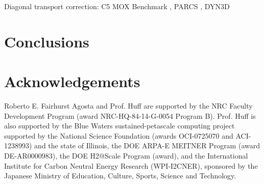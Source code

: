 \documentclass{anstrans}
\begin{document}

Diagonal transport correction:
C5 MOX Benchmark \cite{cavarec_benchmark_1994}, PARCS \cite{downar_parcs_2004}, DYN3D \cite{beckert_development_2007}

\section{Conclusions}



\section{Acknowledgements}

Roberto E. Fairhurst Agosta and Prof. Huff are supported by the \gls{NRC} Faculty Development Program (award NRC-HQ-84-14-G-0054 Program B).
Prof. Huff is also supported by the Blue Waters sustained-petascale computing project supported by the National Science Foundation (awards OCI-0725070 and ACI-1238993) and the state of Illinois, the DOE ARPA-E MEITNER Program (award DE-AR0000983), the DOE H2@Scale Program (award), and the International Institute for Carbon Neutral Energy Research (WPI-I2CNER), sponsored by the Japanese Ministry of Education, Culture, Sports, Science and Technology.



\end{document}
